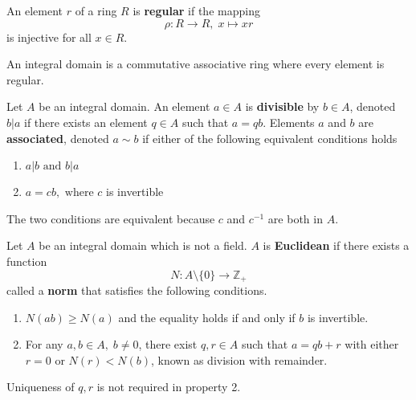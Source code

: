       \begin{definition}
         An element $r$ of a ring $R$ is \textbf{regular} if the mapping 
         \begin{equation}
           \rho: R \longrightarrow R, \; x \mapsto x r
         \end{equation}
        is injective for all $x \in R$. 
      \end{definition}

      \begin{proposition}
        An integral domain is a commutative associative ring where every element is regular. 
      \end{proposition}

      \begin{definition}
        Let $A$ be an integral domain. An element $a \in A$ is \textbf{divisible} by $b \in A$, denoted $b | a$ if there exists an element $q \in A$ such that $a = q b$. Elements $a$ and $b$ are \textbf{associated}, denoted $a \sim b$ if either of the following equivalent conditions holds
        \begin{enumerate}
            \item $a | b \text{ and } b | a$
            \item $a = c b, \text{ where } c$ is invertible
        \end{enumerate}
        The two conditions are equivalent because $c$ and $c^{-1}$ are both in $A$. 
      \end{definition}

      \begin{definition}
        Let $A$ be an integral domain which is not a field. $A$ is \textbf{Euclidean} if there exists a function 
        \begin{equation}
          N: A \setminus \{ 0 \} \longrightarrow \mathbb{Z}_+
        \end{equation}
        called a \textbf{norm} that satisfies the following conditions. 
        \begin{enumerate}
          \item $N(a b) \geq N(a)$ and the equality holds if and only if $b$ is invertible. 
          \item For any $a, b \in A, \; b \neq 0$, there exist $q, r \in A$ such that $a = q b + r$ with either $r = 0$ or $ N(r) < N(b)$, known as division with remainder. 
        \end{enumerate}
        Uniqueness of $q, r$ is not required in property 2. 
      \end{definition}

